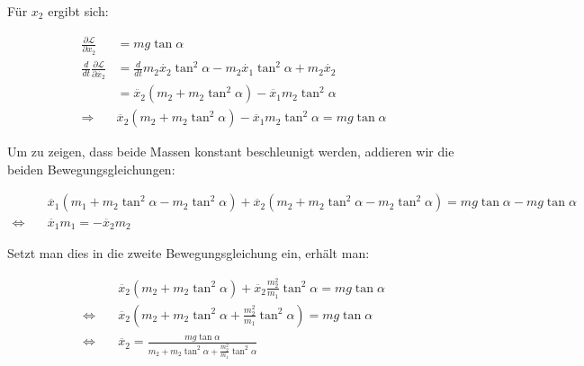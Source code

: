 \documentclass[a4paper,german,12pt,smallheadings]{scrartcl}
\begin{document}
Für $x_2$ ergibt sich:

\begin{align*}
  \frac{\partial \mathcal{L}}{\partial x_2} &= mg \tan \alpha \\
  \frac{d}{dt}\frac{\partial \mathcal{L}}{\partial \dot{x_2}} &= \frac{d}{dt} m_2\dot{x_2} \tan^2 \alpha - m_2 \dot{x_1} \tan^2 \alpha + m_2\dot{x_2} \\
  &= \ddot{x_2}(m_2+m_2 \tan^2 \alpha) - \ddot{x_1} m_2 \tan^2 \alpha \\
  \Rightarrow\quad &\ddot{x_2}(m_2+m_2 \tan^2 \alpha) - \ddot{x_1} m_2 \tan^2 \alpha = mg \tan \alpha
\end{align*}

Um zu zeigen, dass beide Massen konstant beschleunigt werden, addieren wir die beiden Bewegungsgleichungen:

\begin{align*}
&\ddot{x_1}(m_1+m_2 \tan^2 \alpha -m_2 \tan^2 \alpha)+\ddot{x_2}(m_2+m_2 \tan^2 \alpha - m_2 \tan^2 \alpha)=mg \tan \alpha - mg \tan \alpha \\
\Leftrightarrow\quad & \ddot{x_1} m_1 = -\ddot{x_2} m_2
\end{align*}

Setzt man dies in die zweite Bewegungsgleichung ein, erhält man:

\begin{align*}
  &\ddot{x_2}(m_2+m_2 \tan^2 \alpha) + \ddot{x_2} \frac{m_2^2}{m_1} \tan^2 \alpha = mg \tan \alpha \\
  \Leftrightarrow \quad &\ddot{x_2} (m_2+m_2 \tan^2 \alpha + \frac{m_2^2}{m_1} \tan^2 \alpha) = mg \tan \alpha \\
  \Leftrightarrow \quad &\ddot{x_2} = \frac{mg \tan \alpha}{m_2+m_2 \tan^2 \alpha + \frac{m_2^2}{m_1} \tan^2 \alpha}
\end{align*}
\end{document}

